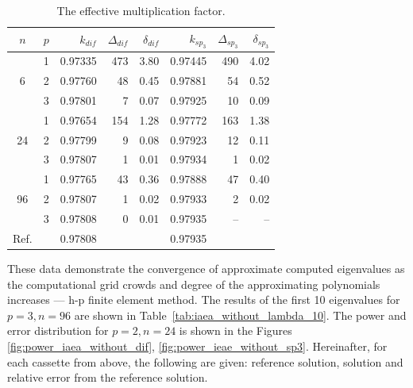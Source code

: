 \documentclass[authoryear]{elsarticle}
\begin{document}
\begin{table}[htp]
\caption{The effective multiplication factor.}
\label{tab:iaea_without_lambda}
\begin{center}
\begin{tabular}{c r r r r r r r}
\hline
$n$ & $p$ & $k_{dif}$ & $\Delta_{dif}$ & $\delta_{dif}$ &$k_{sp_3}$& $\Delta_{sp_3}$ & $\delta_{sp_3}$ \\
\hline
	& 1	& 0.97335& 473& 3.80& 0.97445& 490&  4.02\\
6	& 2	& 0.97760&  48& 0.45& 0.97881&  54&  0.52\\
	& 3	& 0.97801&   7& 0.07& 0.97925&  10&  0.09\\
\hline
	& 1	& 0.97654& 154& 1.28& 0.97772& 163& 1.38\\
24& 2	& 0.97799&   9& 0.08& 0.97923&  12& 0.11\\
	& 3	& 0.97807&   1& 0.01& 0.97934&   1& 0.02\\ 
\hline
	& 1	& 0.97765&  43& 0.36& 0.97888&  47& 0.40\\
96& 2	& 0.97807&   1& 0.02& 0.97933&   2& 0.02\\
	& 3	& 0.97808&   0& 0.01& 0.97935&  --& --\\ 
\hline
Ref.&   & 0.97808&    &     & 0.97935&    &\\ 
\hline
\end{tabular}
\end{center}
\end{table}

These data demonstrate the convergence of approximate computed eigenvalues as the computational grid crowds and degree of the approximating polynomials increases --- h-p finite element method.
The results of the first 10 eigenvalues for $ p = 3, n = 96 $ are shown in Table~\ref{tab:iaea_without_lambda_10}.
The power and error distribution for $p = 2, n = 24$ is shown in the Figures \ref{fig:power_iaea_without_dif}, \ref{fig:power_ieae_without_sp3}.
Hereinafter, for each cassette from above, the following are given: reference solution, solution and relative error from the reference solution.
\end{document}
